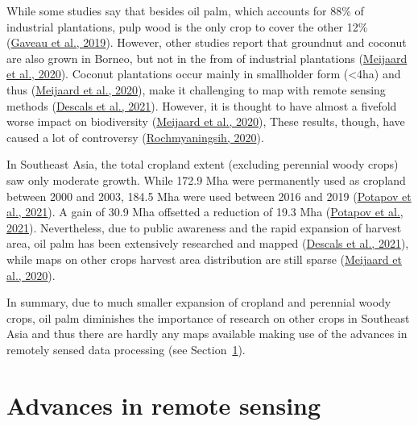 \documentclass[
  letterpaper,
  DIV=11,
  numbers=noendperiod]{scrreprt}
\begin{document}
While some studies say that besides oil palm, which accounts for 88\% of
industrial plantations, pulp wood is the only crop to cover the other
12\% (\protect\hyperlink{ref-gaveauRiseFallForest2019}{Gaveau et al.,
2019}). However, other studies report that groundnut and coconut are
also grown in Borneo, but not in the from of industrial plantations
(\protect\hyperlink{ref-meijaardCoconutOilConservation2020}{Meijaard et
al., 2020}). Coconut plantations occur mainly in smallholder form
(\textless4ha) and thus
(\protect\hyperlink{ref-meijaardCoconutOilConservation2020}{Meijaard et
al., 2020}), make it challenging to map with remote sensing methods
(\protect\hyperlink{ref-descalsHighresolutionGlobalMap2021}{Descals et
al., 2021}). However, it is thought to have almost a fivefold worse
impact on biodiversity
(\protect\hyperlink{ref-meijaardCoconutOilConservation2020}{Meijaard et
al., 2020}), These results, though, have caused a lot of controversy
(\protect\hyperlink{ref-rochmyaningsihClaimThatCoconut2020}{Rochmyaningsih,
2020}).

In Southeast Asia, the total cropland extent (excluding perennial woody
crops) saw only moderate growth. While 172.9 Mha were permanently used
as cropland between 2000 and 2003, 184.5 Mha were used between 2016 and
2019 (\protect\hyperlink{ref-potapovGlobalMapsCropland2021}{Potapov et
al., 2021}). A gain of 30.9 Mha offsetted a reduction of 19.3 Mha
(\protect\hyperlink{ref-potapovGlobalMapsCropland2021}{Potapov et al.,
2021}). Nevertheless, due to public awareness and the rapid expansion of
harvest area, oil palm has been extensively researched and mapped
(\protect\hyperlink{ref-descalsHighresolutionGlobalMap2021}{Descals et
al., 2021}), while maps on other crops harvest area distribution are
still sparse
(\protect\hyperlink{ref-meijaardCoconutOilConservation2020}{Meijaard et
al., 2020}).

In summary, due to much smaller expansion of cropland and perennial
woody crops, oil palm diminishes the importance of research on other
crops in Southeast Asia and thus there are hardly any maps available
making use of the advances in remotely sensed data processing (see
Section~\ref{sec-remotesensing}).

\hypertarget{sec-remotesensing}{%
\section{Advances in remote sensing}\label{sec-remotesensing}}
\end{document}
